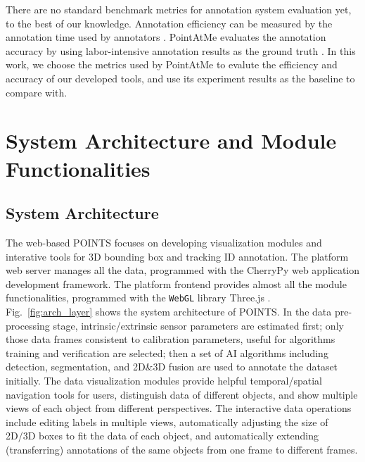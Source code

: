 \documentclass[letterpaper, 10 pt, conference]{ieeeconf}  %
\begin{document}
There are no standard benchmark metrics for annotation system evaluation yet, to the best of our knowledge.
Annotation efficiency can be measured by the annotation time used by annotators \cite{monica2017multi,pointatme,Zimmer20193DBA}. 
PointAtMe evaluates the annotation accuracy by using labor-intensive annotation results as the ground truth \cite{pointatme}. 
In this work, we choose the metrics used by PointAtMe \cite{pointatme} to evalute the efficiency and accuracy of our developed tools, 
and use its experiment results as the baseline to compare with.


\section{System Architecture and Module Functionalities}
\label{sec:systemarch}

\subsection{System Architecture}

The web-based POINTS focuses on developing visualization modules and interative tools for 3D bounding box and tracking ID annotation.
The platform web server manages all the data, programmed with the CherryPy \cite{cherrypy} web application development framework.
The platform frontend provides almost all the module functionalities, programmed with the \texttt{WebGL} library Three.js \cite{threejs}.
Fig.~\ref{fig:arch_layer} shows the system architecture of POINTS.
In the data pre-processing stage, intrinsic/extrinsic sensor parameters are estimated first; only those data frames consistent to calibration parameters, useful for algorithms training and verification are selected; then a set of AI algorithms including detection, segmentation, and 2D\&3D fusion are used to annotate the dataset initially. The data visualization modules provide helpful temporal/spatial navigation tools for users, distinguish data of different objects, and show multiple views of each object from different perspectives. The interactive data operations include editing labels in multiple views, automatically adjusting the size of 2D/3D boxes to fit the data of each object, and automatically extending (transferring) annotations of the same objects from one frame to different frames.
\end{document}

